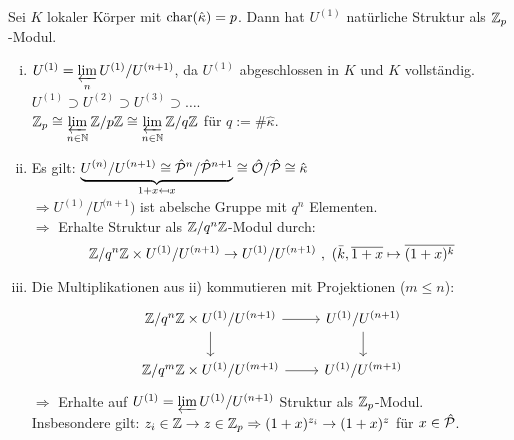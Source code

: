 \begin{Bem}
Sei $K$ lokaler Körper mit $\operatorname{char}(\hat{\kappa})=p$. Dann hat $U^{(1)}$ natürliche Struktur als $\mathbb{Z}_p$-Modul.
\begin{enumerate}[i)]
\item $U^{(1)}=\varprojlim\limits_n U^{(1)}/U^{(n+1)}$, da $U^{(1)}$ abgeschlossen in $K$ und $K$ vollständig.\\
$U^{(1)} \supset U^{(2)} \supset U^{(3)} \supset \dots$.\\
$\mathbb{Z}_p \cong \varprojlim\limits_{n \in \mathbb{N}} \mathbb{Z}/p\mathbb{Z} \cong \varprojlim\limits_{n \in \mathbb{N}} \mathbb{Z}/q\mathbb{Z}$ für $q:=\#\hat{\kappa}$.
\item Es gilt: $\underbrace{U^{(n)}/U^{(n+1)} \cong \hat{\mathcal{P}}^n/\hat{\mathcal{P}}^{n+1}}_{1+x \mapsfrom x} \cong \hat{\mathcal{O}} / \hat{\mathcal{P}} \cong \hat{\kappa}$\\
$\Rightarrow U^{(1)}/U^{(n+1})$ ist abelsche Gruppe mit $q^n$ Elementen.\\
$\Rightarrow$ Erhalte Struktur als $\mathbb{Z}/q^n\mathbb{Z}$-Modul durch:
\[\mathbb{Z}/q^n\mathbb{Z} \times U^{(1)}/U^{(n+1)} \to U^{(1)}/U^{(n+1)} \ , \ (\bar{k}, \overline{1+x} \mapsto \overline{(1+x)^k}\]
\item Die Multiplikationen aus ii) kommutieren mit Projektionen ($m \leq n$):
\[\begin{tikzcd}
\Z/q^n\Z \times U^{(1)}/U^{(n+1)} \arrow[r] \arrow[d] & U^{(1)}/U^{(n+1)} \arrow[d]\\
\Z/q^m\Z \times U^{(1)}/U^{(m+1)} \arrow[r] &U^{(1)}/U^{(m+1)}
\end{tikzcd}\]
$\Rightarrow$ Erhalte auf $U^{(1)}= \varprojlim\limits U^{(1)}/U^{(n+1)}$ Struktur als $\mathbb{Z}_p$-Modul.\\ Insbesondere gilt: $z_i \in \mathbb{Z} \to z \in \mathbb{Z}_p \Rightarrow (1+x)^{z_i} \to (1+x)^z$ für $x \in \hat{\mathcal{P}}$.
\end{enumerate}
\end{Bem}